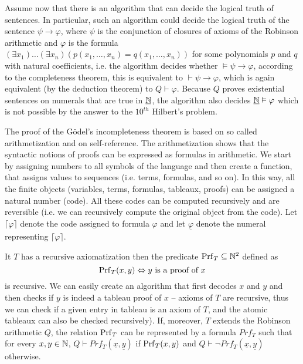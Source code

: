 Assume now that there is an algorithm that can decide the logical truth of sentences. In particular, such an algorithm could decide the logical truth of the sentence $\psi \to \varphi$, where $\psi$ is the conjunction of closures of axioms of the Robinson arithmetic and $\varphi$ is the formula $(\exists x_1)\dots(\exists x_n)(p(x_1, \dots, x_n) = q(x_1, \dots, x_n))$ for some polynomials $p$ and $q$ with natural coefficients, i.e. the algorithm decides whether $\vDash \psi \to \varphi$, according to the completeness theorem, this is equivalent to $\vdash \psi \to \varphi$, which is again equivalent (by the deduction theorem) to $Q \vdash \varphi$. Because $Q$ proves existential sentences on numerals that are true in $\underline{\mathbb{N}}$, the algorithm also decides $\underline{\mathbb{N}} \vDash \varphi$ which is not possible by the answer to the $10^{th}$ Hilbert's problem.

The proof of the Gödel's incompleteness theorem is based on so called arithmetization and on self-reference. The arithmetization shows that the syntactic notions of proofs can be expressed as formulas in arithmetic. We start by assigning numbers to all symbols of the language and then create a function, that assigns values to sequences (i.e. terms, formulas, and so on). In this way, all the finite objects (variables, terms, formulas, tableaux, proofs) can be assigned a natural number (code). All these codes can be computed recursively and are reversible (i.e. we can recursively compute the original object from the code). Let $\lceil \varphi \rceil$ denote the code assigned to formula $\varphi$ and let $\underline{\varphi}$ denote the numeral representing $\lceil \varphi \rceil$.

It $T$ has a recursive axiomatization then the predicate $\operatorname{Prf}_T \subseteq \mathbb{N}^2$ defined as $$\operatorname{Prf}_T(x, y) \Leftrightarrow y \text{ is a proof of } x$$ is recursive. We can easily create an algorithm that first decodes $x$ and $y$ and then checks if $y$ is indeed a tableau proof of $x$ -- axioms of $T$ are recursive, thus we can check if a given entry in tableau is an axiom of $T$, and the atomic tableaux can also be checked recursively). If, moreover, $T$ extends the Robinson arithmetic $Q$, the relation $\operatorname{Prf}_T$ can be represented by a formula $Prf_T$ such that for every $x, y \in \mathbb{N}$, $Q \vdash Prf_T(\underline{x}, \underline{y})$ if $\operatorname{Prf}_T(x,y)$ and $Q \vdash \neg Prf_T(\underline{x}, \underline{y})$ otherwise.

